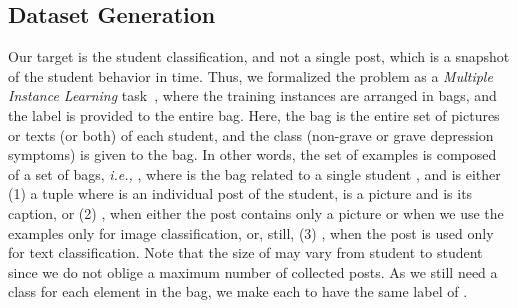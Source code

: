 \documentclass[letterpaper]{article} \usepackage{aaai20}  \usepackage{times}  \usepackage{helvet} \usepackage{courier}  \usepackage[hyphens]{url}  \usepackage{graphicx} \urlstyle{rm} \def\UrlFont{\rm}  \usepackage{graphicx}  \frenchspacing  \setlength{\pdfpagewidth}{8.5in}  \setlength{\pdfpageheight}{11in}  \usepackage[final]{changes}
\begin{document}
\subsection{Dataset Generation}\label{sec:data-generation}
Our target is the student classification, and not a single post, which is a snapshot of the student behavior in time. Thus, we formalized the problem as a \textit{Multiple Instance Learning} task~\cite{carbonneau2018multiple}, where the training instances are arranged in bags, and the label is provided to the entire bag. Here, the bag is the entire set of pictures or texts (or both) of each student, and the class (non-grave or grave depression symptoms) is given to the bag. In other words, the set of examples  is composed of a set of bags, \textit{i.e.,} , where  is the bag related to a single student , and  is either (1) a tuple  where  is an individual post of the student,  is a picture and  is its caption, or (2) , when either the post contains only a picture or when we use the examples only for image classification, or, still, (3) , when the post is used only for text classification. Note that the size of  may vary from student to student since we do not oblige a maximum number of collected posts. As we still need a class for each element in the bag, we make each  to have the same label  of . 
\end{document}
